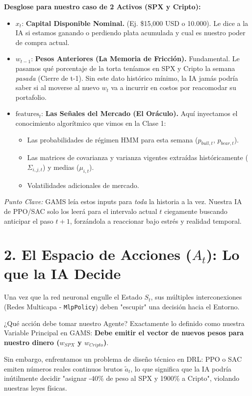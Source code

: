 \documentclass[11pt]{article}
\begin{document}
\textbf{Desglose para nuestro caso de 2 Activos (SPX y Cripto):}
\begin{itemize}
    \item $x_t$: \textbf{Capital Disponible Nominal.} (Ej. \$15,000 USD o 10.000). Le dice a la IA si estamos ganando o perdiendo plata acumulada y cual es nuestro poder de compra actual.
    \item $w_{t-1}$: \textbf{Pesos Anteriores (La Memoria de Fricción).} Fundamental. Le pasamos qué porcentaje de la torta teníamos en SPX y Cripto la semana \textit{pasada} (Cierre de t-1). Sin este dato histórico mínimo, la IA jamás podría saber si al moverse al nuevo $w_t$ va a incurrir en costos por reacomodar su portafolio.
    \item $\text{features}_t$: \textbf{Las Señales del Mercado (El Oráculo).} Aquí inyectamos el conocimiento algorítmico que vimos en la Clase 1:
    \begin{itemize}
        \item Las probabilidades de régimen HMM para esta semana ($p_{bull, t}$, $p_{bear, t}$).
        \item Las matrices de covarianza y varianza vigentes extraídas históricamente ($\Sigma_{i,j,t}$) y medias ($\mu_{i,t}$).
        \item Volatilidades adicionales de mercado.
    \end{itemize}
\end{itemize}
\textit{Punto Clave:} GAMS leía estos inputs para \textit{toda} la historia a la vez. Nuestra IA de PPO/SAC solo los leerá para el intervalo actual $t$ ciegamente buscando anticipar el paso $t+1$, forzándola a reaccionar bajo estrés y realidad temporal.

\section{2. El Espacio de Acciones ($A_t$): Lo que la IA Decide}
Una vez que la red neuronal engulle el Estado $S_t$, sus múltiples interconexiones (Redes Multicapa - \texttt{MlpPolicy}) deben "escupir" una decisión hacia el Entorno.

¿Qué acción debe tomar nuestro Agente? Exactamente lo definido como nuestra Variable Principal en GAMS: \textbf{Debe emitir el vector de nuevos pesos para nuestro dinero ($w_{SPX}$ y $w_{Cripto}$)}. 

Sin embargo, enfrentamos un problema de diseño técnico en DRL: PPO o SAC emiten números reales continuos brutos $\tilde{a}_t$, lo que significa que la IA podría inútilmente decidir "asignar -40\% de peso al SPX y 1900\% a Cripto", violando nuestras leyes físicas.
\end{document}
